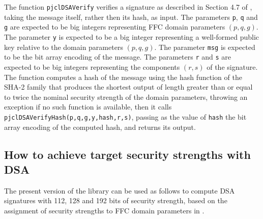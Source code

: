 \documentclass[12pt]{article}
\begin{document}
The function {\tt pjclDSAVerify} verifies a signature as described in
Section 4.7 of \cite{DSS-4}, taking the message itself, rather then its hash, as input.
The parameters {\tt p}, {\tt q} and {\tt g} are expected to be big integers 
representing FFC domain parameters $(p,q,g)$.
The parameter {\tt y} is expected to be a big integer
representing a well-formed public key relative to the domain parameters $(p,q,g)$.
The parameter {\tt msg} is expected to be the bit array encoding of the message.
The parameters {\tt r} and {\tt s} are expected to be big integers
representing the components $(r,s)$ of the signature.
The function computes a hash of the message using the hash function of the 
SHA-2 family that produces the shortest output of length greater than or equal to 
twice the nominal security strength of the domain
parameters, throwing an exception if no such function is available, then it calls
{\tt pjclDSAVerifyHash(p,q,g,y,hash,r,s)}, passing as the value of {\tt hash}
the bit array encoding of the computed hash, and returns its output.

\subsection{How to achieve target security strengths with DSA}

The present version of the library can be used as follows to compute DSA signatures
with 112, 128 and 192 bits of security strength, based on the assignment of security
strengths to FFC domain parameters in \cite[Table 2, Column 3]{sp800-57part1rev4}.
\end{document}
